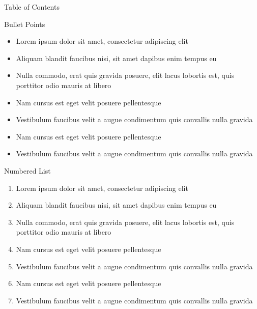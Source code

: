 \documentclass[aspectratio=169,xcolor=dvipsnames, t]{beamer}
\begin{document}
    \maketitlepage
    \begin{frame}[t]{Table of Contents}
        \vfill
        \tableofcontents
        \vfill
    \end{frame}

        


    \begin{frame}{Bullet Points}
        \begin{itemize}
            \item Lorem ipsum dolor sit amet, consectetur adipiscing elit
            \item Aliquam blandit faucibus nisi, sit amet dapibus enim tempus eu
            \item Nulla commodo, erat quis gravida posuere, elit lacus lobortis est, quis porttitor odio mauris at libero
            \item Nam cursus est eget velit posuere pellentesque
            \item Vestibulum faucibus velit a augue condimentum quis convallis nulla gravida
            \item Nam cursus est eget velit posuere pellentesque
            \item Vestibulum faucibus velit a augue condimentum quis convallis nulla gravida
        \end{itemize}
    \end{frame}

    \begin{frame}{Numbered List}
        \begin{enumerate}
            \item Lorem ipsum dolor sit amet, consectetur adipiscing elit
            \item Aliquam blandit faucibus nisi, sit amet dapibus enim tempus eu
            \item Nulla commodo, erat quis gravida posuere, elit lacus lobortis est, quis porttitor odio mauris at libero
            \item Nam cursus est eget velit posuere pellentesque
            \item Vestibulum faucibus velit a augue condimentum quis convallis nulla gravida
            \item Nam cursus est eget velit posuere pellentesque
            \item Vestibulum faucibus velit a augue condimentum quis convallis nulla gravida
        \end{enumerate}
    \end{frame}
\end{document}
